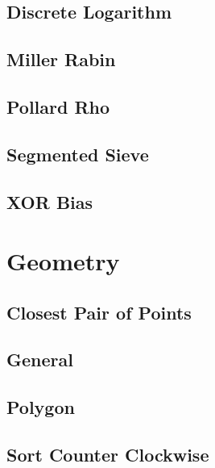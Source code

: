 \subsection{	Discrete Logarithm}
\raggedbottom
\hrulefill
\subsection{	Miller Rabin}
\raggedbottom
\hrulefill
\subsection{	Pollard Rho}
\raggedbottom
\hrulefill
\subsection{	Segmented Sieve}
\raggedbottom
\hrulefill
\subsection{	XOR Bias}
\raggedbottom
\hrulefill

\section{Geometry}
\subsection{	Closest Pair of Points}
\raggedbottom
\hrulefill
\subsection{	General}
\raggedbottom
\hrulefill
\subsection{	Polygon}
\raggedbottom
\hrulefill
\subsection{	Sort Counter Clockwise}
\raggedbottom
\hrulefill
